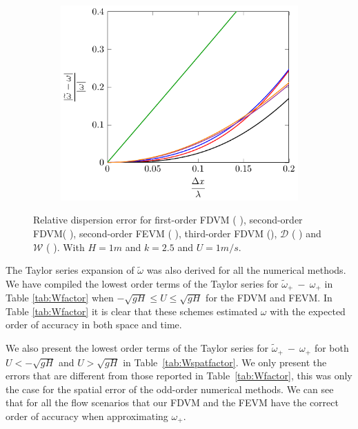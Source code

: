 \begin{figure}
\begin{subfigure}{0.5\textwidth}
		\includegraphics[width=\textwidth]{./chp4/figures/Dispu1khFillz.pdf}
	\end{subfigure}
	\caption{Relative dispersion error for first-order FDVM ({\color{green!60!black} \solidrule}), second-order FDVM({\color{red} \solidrule}), second-order FEVM ({\color{blue} \solidrule}), third-order FDVM ({\solidrule}), $\mathcal{D}$ ({\color{violet!80!white} \solidrule}) and $\mathcal{W}$ ({\color{orange} \solidrule}). With $H = 1m$  and $k = 2.5$ and $U = 1m/s$.}
	\label{fig:Dispu1Fill}
\end{figure}


The Taylor series expansion of $\widetilde{\omega}$ was also derived for all the numerical methods. We have compiled the lowest order terms of the Taylor series for $\widetilde{\omega}_+~-~\omega_+$ in Table \ref{tab:Wfactor} when $ -\sqrt{gH} \le U \le \sqrt{gH}$ for the FDVM and FEVM. In Table \ref{tab:Wfactor} it is clear that these schemes estimated $\omega$ with the expected order of accuracy in both space and time.

We also present the lowest order terms of the Taylor series for $\widetilde{\omega}_+~-~\omega_+$ for both $ U < -\sqrt{gH}$ and $ U > \sqrt{gH}$ in Table~\ref{tab:Wspatfactor}. We only present the errors that are different from those reported in Table~\ref{tab:Wfactor}, this was only the case for the spatial error of the odd-order numerical methods. We can see that for all the flow scenarios that our FDVM and the FEVM have the correct order of accuracy when approximating $\omega_+$. 


